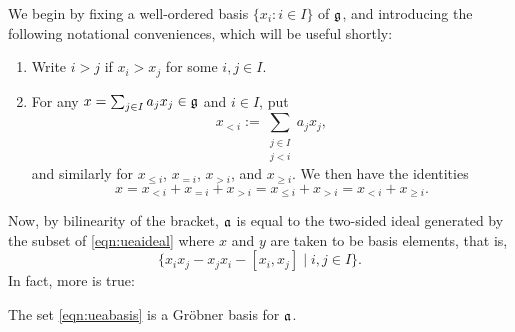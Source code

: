 We begin by fixing a well-ordered basis $\{x_i:i\in I\}$ of $\mathfrak{g}$, and introducing the following notational conveniences, which will be useful shortly:
\begin{notation}
\begin{enumerate}
\item Write $i>j$ if $x_i>x_j$ for some $i,j\in I$.
\item For any $x=\sum_{j\in I}a_jx_j\in\mathfrak{g}$ and $i\in I$, put
\begin{equation*}
x_{<i}:=\sum_{\substack{j\in I\\j<i}}a_jx_j,
\end{equation*}
and similarly for $x_{\le i}$, $x_{=i}$, $x_{>i}$, and $x_{\ge i}$. We then have the identities
\begin{equation*}
x=x_{<i}+x_{=i}+x_{>i}=x_{\le i}+x_{>i}=x_{<i}+x_{\ge i}.
\end{equation*}

\end{enumerate}
\end{notation}
Now, by bilinearity of the bracket, $\mathfrak{a}$ is equal to the two-sided ideal generated by the subset of \eqref{eqn:ueaideal} where $x$ and $y$ are taken to be basis elements, that is,
\begin{equation}
\label{eqn:ueabasis}
\{x_ix_j-x_jx_i-[x_i,x_j]\mid i,j\in I\}.
\end{equation}
In fact, more is true:
\begin{lem}
\label{lem:ueagrobner}
The set \eqref{eqn:ueabasis} is a Gr\"obner basis for $\mathfrak{a}$.
\end{lem}
